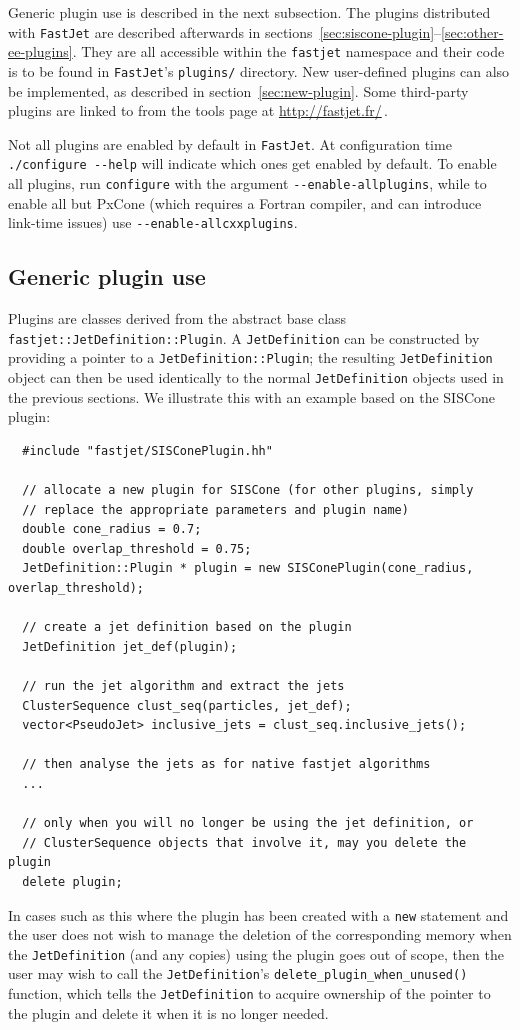 \documentclass[12pt,a4]{article}
\newcommand{\fastjet}{\texttt{FastJet}\xspace}
\newcommand{\ttt}[1]{{\small\texttt{#1}}}
\begin{document}
Generic plugin use is described in the next subsection.
%
The plugins distributed with \fastjet are described afterwards in
sections~\ref{sec:siscone-plugin}--\ref{sec:other-ee-plugins}.
%
They are all accessible within the \ttt{fastjet} namespace and their code
is to be found in \fastjet's \ttt{plugins/} directory.
%
New user-defined plugins can also be implemented, as described 
in section~\ref{sec:new-plugin}. 
%
Some third-party plugins are linked to from the tools page at
\url{http://fastjet.fr/}$\,$.

Not all plugins are enabled by default in \fastjet. At configuration
time \verb:./configure --help: will indicate which ones get enabled
by default. To enable all plugins, run \verb|configure| with the
argument \verb|--enable-allplugins|, while to enable all but PxCone
(which requires a Fortran compiler, and can introduce link-time issues) use
\verb|--enable-allcxxplugins|.


\subsection{Generic plugin use}
\label{sec:generic-plugin-use}

Plugins are classes derived from the abstract base class
\ttt{fastjet::JetDefinition::Plugin}.
%
A \ttt{JetDefinition} can be constructed by providing a pointer to a
\ttt{JetDefinition::Plugin}; the resulting \ttt{JetDefinition} object
can then be used identically to the normal \ttt{JetDefinition} objects
used in the previous sections.
%
We illustrate this with an example based on the SISCone plugin:
\begin{lstlisting}
  #include "fastjet/SISConePlugin.hh"

  // allocate a new plugin for SISCone (for other plugins, simply
  // replace the appropriate parameters and plugin name)
  double cone_radius = 0.7;
  double overlap_threshold = 0.75;
  JetDefinition::Plugin * plugin = new SISConePlugin(cone_radius, overlap_threshold);

  // create a jet definition based on the plugin
  JetDefinition jet_def(plugin);

  // run the jet algorithm and extract the jets
  ClusterSequence clust_seq(particles, jet_def);
  vector<PseudoJet> inclusive_jets = clust_seq.inclusive_jets();

  // then analyse the jets as for native fastjet algorithms
  ...

  // only when you will no longer be using the jet definition, or
  // ClusterSequence objects that involve it, may you delete the plugin
  delete plugin;
\end{lstlisting}
%
In cases such as this where the plugin has been created with a
\ttt{new} statement and the user does not wish to manage the deletion
of the corresponding memory when the \ttt{JetDefinition} (and any
copies) using the plugin goes out of scope, then the user may wish to
call the \ttt{JetDefinition}'s \ttt{delete\_plugin\_when\_unused()}
function, which tells the \ttt{JetDefinition} to acquire ownership of
the pointer to the plugin and delete it when it is no longer needed.
\end{document}
